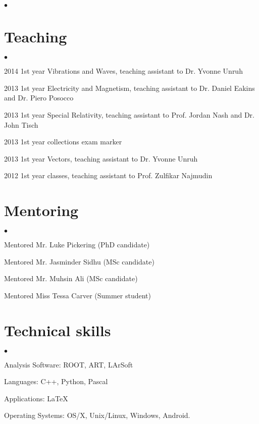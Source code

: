 \documentclass[margin,line]{res}
\newenvironment{list2}{
  \begin{list}{$\bullet$}{%
      \setlength{\itemsep}{0in}
      \setlength{\parsep}{0in} \setlength{\parskip}{0in}
      \setlength{\topsep}{0in} \setlength{\partopsep}{0in} 
      \setlength{\leftmargin}{0.2in}}}{\end{list}}
\begin{document}
\begin{resume}
\begin{list2}
\end{list2}

\section{\sc Teaching }
\begin{list2}
\item 2014 1st year Vibrations and Waves, teaching assistant to Dr. Yvonne Unruh
\item 2013 1st year Electricity and Magnetism, teaching assistant to Dr. Daniel Eakins and Dr. Piero Posocco
\item 2013 1st year Special Relativity, teaching assistant to Prof. Jordan Nash and Dr. John Tisch
\item 2013 1st year collections exam marker
\item 2013 1st year Vectors, teaching assistant to Dr. Yvonne Unruh
\item 2012 1st year classes, teaching assistant to Prof. Zulfikar Najmudin

\end{list2}

\section{\sc Mentoring }
\begin{list2}
\item Mentored Mr. Luke Pickering (PhD candidate)
\item Mentored Mr. Jasminder Sidhu (MSc candidate)
\item Mentored Mr. Muhsin Ali (MSc candidate)
\item Mentored Miss Tessa Carver (Summer student)


\end{list2}


\section{\sc Technical skills} 
\begin{list2}
\item Analysis Software: ROOT, ART, LArSoft
\item Languages: C++, Python, Pascal
\item Applications:  \LaTeX
\item Operating Systems:  OS/X, Unix/Linux, Windows, Android.


\end{list2}



\end{resume}
\end{document}
